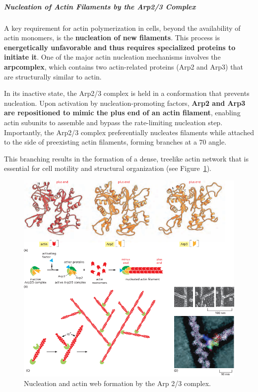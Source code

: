 \documentclass[../main.tex]{subfiles}
\begin{document}
\subparagraph{Nucleation of Actin Filaments by the Arp2/3 Complex}
A key requirement for actin polymerization in cells, beyond the availability of actin monomers, is the \textbf{nucleation of new filaments}. This process is \textbf{energetically unfavorable and thus requires specialized proteins to initiate it}. One of the major actin nucleation mechanisms involves the \textbf{\gls{arpcomplex}}, which contains two actin-related proteins (Arp2 and Arp3) that are structurally similar to actin.

In its inactive state, the Arp2/3 complex is held in a conformation that prevents nucleation. Upon activation by nucleation-promoting factors, \textbf{Arp2 and Arp3 are repositioned to mimic the plus end of an actin filament}, enabling actin subunits to assemble and bypass the rate-limiting nucleation step. Importantly, the Arp2/3 complex preferentially nucleates filaments while attached to the side of preexisting actin filaments, forming branches at a 70\textdegree{} angle. 

This branching results in the formation of a dense, treelike actin network that is essential for cell motility and structural organization (see Figure~\ref{fig:arp2-3-nucleation}).

\begin{figure}[H]
	\centering
	\includegraphics[width = 0.7 \textwidth]{10}
	\caption{Nucleation and actin web formation by the Arp 2/3 complex.}
	\label{fig:arp2-3-nucleation}
\end{figure}
\end{document}
